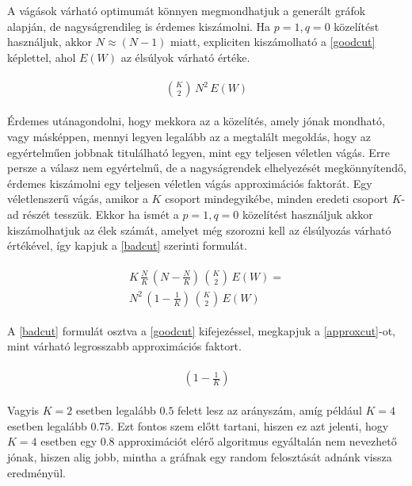 A vágások várható optimumát könnyen megmondhatjuk a generált gráfok alapján, de nagyságrendileg is érdemes kiszámolni. Ha $p=1, q=0$ közelítést használjuk, akkor $N \approx (N-1)$ miatt, expliciten kiszámolható a \ref{goodcut} képlettel, ahol $E(W)$ az élsúlyok várható értéke.

\begin{align}
	\begin{split}
		\binom{K}{2} \, N^2 \, E(W) \label{goodcut}		
	\end{split}
\end{align}

Érdemes utánagondolni, hogy mekkora az a közelítés, amely jónak mondható, vagy másképpen, mennyi legyen legalább az a megtalált megoldás, hogy az egyértelműen jobbnak titulálható legyen, mint egy teljesen véletlen vágás. Erre persze a válasz nem egyértelmű, de a nagyságrendek elhelyezését megkönnyítendő, érdemes kiszámolni egy teljesen véletlen vágás approximációs faktorát. Egy véletlenszerű vágás, amikor a $K$ csoport mindegyikébe, minden eredeti csoport $K$-ad részét tesszük. Ekkor ha ismét a $p=1, q=0$ közelítést használjuk akkor kiszámolhatjuk az élek számát, amelyet még szorozni kell az élsúlyozás várható értékével, így kapjuk a \ref{badcut} szerinti formulát. 

\begin{align}
	\begin{split}
		K \, \frac{N}{K} \, \left( N-\frac{N}{K} \right) \, \binom{K}{2} \, E(W) = \label{badcut} \\
		 N^2 \, \left( 1 -\frac{1}{K} \right) \,\binom{K}{2} \, E(W)
	\end{split}
\end{align}

A \ref{badcut} formulát osztva a \ref{goodcut} kifejezéssel, megkapjuk a \ref{approxcut}-ot, mint várható legrosszabb approximációs faktort.

\begin{align}
	\begin{split}
		\left( 1 -\frac{1}{K} \right) \label{approxcut}
	\end{split}
\end{align}

Vagyis $K=2$ esetben legalább $0.5$ felett lesz az arányszám, amíg például $K=4$ esetben legalább $0.75$. Ezt fontos szem előtt tartani, hiszen ez azt jelenti, hogy $K=4$ esetben egy $0.8$ approximációt elérő algoritmus egyáltalán nem nevezhető jónak, hiszen alig jobb, mintha a gráfnak egy random felosztását adnánk vissza eredményül.

